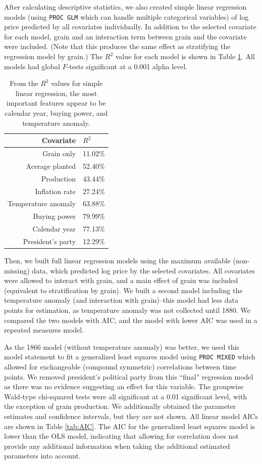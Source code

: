 \documentclass[11pt]{article}
\begin{document}
After calculating descriptive statistics, we also created simple linear
regression models (using \texttt{PROC GLM} which can handle multiple
categorical variables) of log price predicted by all covariates individually.
In addition to the selected covariate for each model, grain and an interaction
term between grain and the covariate were included. (Note that this produces
the same effect as stratifying the regression model by grain.) The $R^2$ value
for each model is shown in Table \ref{tab:SLR}. All models had global $F$-tests
significant at a 0.001 alpha level.

\begin{table}[h!]
	\centering
	\begin{tabular}{rl}
		\toprule
		Covariate & $R^2$  \\
		\midrule
		Grain only & 11.02\%  \\
		Acerage planted & 52.40\%  \\
		Production & 43.44\%  \\
		Inflation rate & 27.24\% \\
		Temperature anomaly & 63.88\% \\
		Buying power & 79.99\% \\
		Calendar year & 77.13\% \\
		President's party & 12.29\% \\
		\bottomrule
	\end{tabular}
	\caption{From the $R^2$ values for simple linear regression, the most
	important features appear to be calendar year, buying power, and
	temperature anomaly.}
	\label{tab:SLR}
\end{table}

Then, we built full linear regression models using the maximum available
(non-missing) data, which predicted log price by the selected covariates. All
covariates were
allowed to interact with grain, and a main effect of grain was included
(equivalent to stratification by grain). We built a second model including the
temperature anomaly (and interaction with grain)--this model had less data
points for estimation, as temperature anomaly was not collected until 1880. We
compared the two models with AIC, and the model with lower AIC was used in a
repeated measures model.

As the 1866 model (without temperature anomaly) was better, we used this model
statement to fit a generalized least squares model using \texttt{PROC MIXED}
which allowed for exchangeable (compound symmetric) correlations between time
points. We removed president's political party from this ``final'' regression
model as there was no evidence suggesting an effect for this variable. The
groupwise Wald-type chi-squared tests were all significant at a 0.01
significant level, with the exception of grain production. We additionally
obtained the parameter estimates and confidence intervals, but they are not
shown. All linear model AICs are shown in Table \ref{tab:AIC}. The AIC for the
generalized least squares model is lower than the OLS model, indicating that
allowing for correlation does not provide any additional information when
taking the additional estimated parameters into account.
\end{document}
